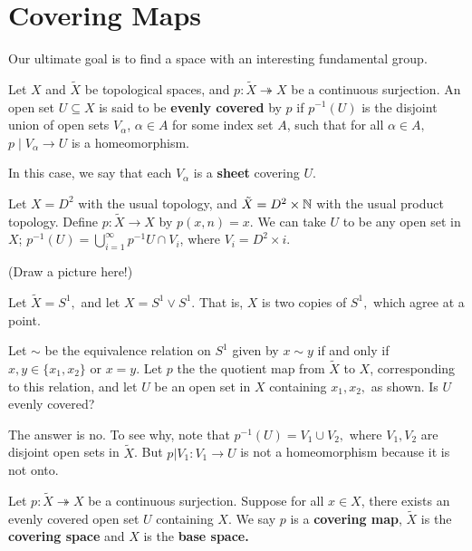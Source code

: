 \section{Covering Maps}

Our ultimate goal is to find a space with an interesting fundamental group.  

\begin{definition}  Let $X$ and $\tilde{X}$ be topological spaces, and $p:\tilde{X}\twoheadrightarrow X$ be a continuous surjection.  An open set $U \subseteq X$ is said to be \textbf{evenly covered} by $p$ if $p^{-1}(U)$ is the disjoint union of open sets $V_{\alpha}$, $\alpha \in A$ for some index set $A$, such that for all $\alpha \in A,$ $p \mid V_{\alpha} \rightarrow U$ is a homeomorphism.  

In this case, we say that each $V_{\alpha}$ is a \textbf{sheet} covering $U$.
\end{definition}


\begin{example}
 Let $X=D^2$ with the usual topology, and $\tilde{X}=D^2 \times \mathbb N$ with the usual product topology.  Define $p:\tilde{X} \rightarrow X$ by $p(x,n)=x.$  We can take $U$ to be any open set in $X$; $\displaystyle p^{-1}(U)=\bigcup_{i=1}^{\infty}p^{-1}{U}\cap V_i$, where $V_i=D^2 \times i$.

(Draw a picture here!)
\placeholder
\end{example}

\begin{example}
Let $\tilde{X}=S^1,$ and let $X=S^1 \lor S^1.$  That is, $X$ is two copies of $S^1,$ which agree at a point.  

Let $\sim$ be the equivalence relation on $S^1$ given by $x \sim y$ if and only if $x,y \in \{x_1,x_2\}$ or $x=y$.  Let $p$ the the quotient map from $\tilde{X}$ to $X$, corresponding to this relation, and let $U$ be an open set in $X$ containing $x_1,x_2,$ as shown.  Is $U$ evenly covered?

The answer is no.  To see why, note that $p^{-1}(U)=V_1 \cup V_2,$ where $V_1,V_2$ are disjoint open sets in $\tilde{X}$.  But $p \vert V_1: V_1 \rightarrow U$ is not a homeomorphism because it is not onto.  
\end{example}

\begin{definition}  Let $p: \tilde{X} \twoheadrightarrow X$ be a continuous surjection.  Suppose for all $x \in X$, there exists an evenly covered open set $U$ containing $X$.   We say $p$ is a \textbf{covering map}, $\tilde{X}$ is the \textbf{covering space} and $X$ is the \textbf{base space.}
\end{definition}

